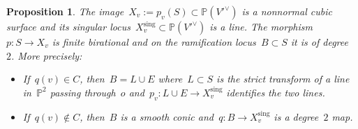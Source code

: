 \documentclass[a4paper]{amsart}
\newcommand{\bbP}{\mathbb{P}}
\newcommand{\sing}{{\mathrm{sing}}}
\theoremstyle{plain}
\newtheorem{proposition}[theorem]{Proposition}
\theoremstyle{definition}
\numberwithin{equation}{section}
\begin{document}
\begin{proposition} \label{prop:ProjectionHirzebruchSurface} The image~$X_v := p_v(S) \subset \bbP(V'^\vee)$ is a nonnormal cubic surface and its singular locus~$X_v^\sing \subset \bbP(V'^\vee)$ is a line. The morphism~$p\colon S \to X_v$ is finite birational and on the ramification locus~$B \subset S$ it is of degree~$2$. More precisely:
\begin{itemize}
\item If~$q(v) \in C$, then~$B = L \cup E$ where~$L \subset S$ is the strict transform of a line in~$\bbP^2$ passing through~$o$ and~$p_v \colon L \cup E \to X_v^\sing$ identifies the two lines. \smallskip
\item If~$q(v) \not \in C$, then~$B$ is a smooth conic and~$q \colon B \to X_v^\sing$ is a degree~$2$ map.
\end{itemize}
\end{proposition}
\end{document}

